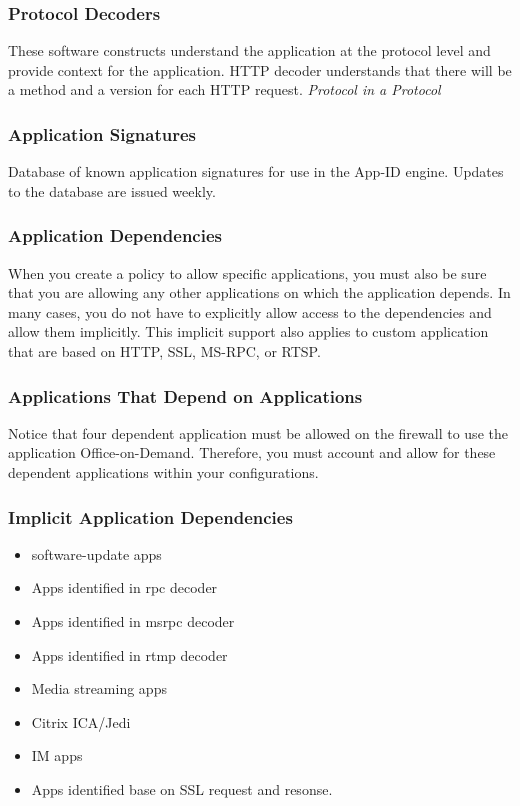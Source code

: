 \subsubsection{Protocol Decoders}
These software constructs understand the application at the protocol level and provide context for the application. HTTP decoder understands that there will be a method and a version for each HTTP request. \textit{Protocol in a Protocol}

\subsubsection{Application Signatures}
Database of known application signatures for use in the App-ID engine. Updates to the database are issued weekly.

\subsubsection{Application Dependencies}
When you create a policy to allow specific applications, you must also be sure that you are allowing any other applications on which the application depends. In many cases, you do not have to explicitly allow access to the dependencies and allow them implicitly. This implicit support also applies to custom application that are based on HTTP, SSL, MS-RPC, or RTSP.

\subsubsection{Applications That Depend on Applications}
Notice that four dependent application must be allowed on the firewall to use the application Office-on-Demand. Therefore, you must account and allow for these dependent applications within your configurations.

\subsubsection{Implicit Application Dependencies}
    \begin{itemize}
        \item software-update apps
        \item Apps identified in rpc decoder
        \item Apps identified in msrpc decoder
        \item Apps identified in rtmp decoder
        \item Media streaming apps
        \item Citrix ICA/Jedi
        \item IM apps
        \item Apps identified base on SSL request and resonse.
    \end{itemize}
    
